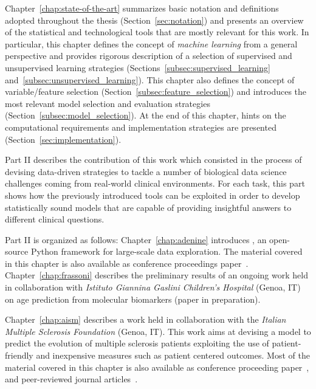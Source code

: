 Chapter~\ref{chap:state-of-the-art} summarizes basic notation and definitions adopted throughout the thesis (Section~\ref{sec:notation}) and presents an overview of the statistical and technological tools that are mostly relevant for this work. In particular, this chapter defines the concept of \textit{machine learning} from a general perspective and provides rigorous description of a selection of supervised and unsupervised learning strategies (Sections~\ref{subsec:supervised_learning} and~\ref{subsec:unsupervised_learning}).
This chapter also defines the concept of variable/feature selection (Section~\ref{subsec:feature_selection}) and introduces the most relevant model selection and evaluation strategies (Section~\ref{subsec:model_selection}).
At the end of this chapter, hints on the computational requirements and implementation strategies are presented (Section~\ref{sec:implementation}).

Part II describes the contribution of this work which consisted in the process of devising data-driven strategies to tackle a number of biological data science challenges coming from real-world clinical environments. For each task, this part shows how the previously introduced tools can be exploited in order to develop statistically sound models that are capable of providing insightful answers to different clinical questions.

Part II is organized as follows:
Chapter~\ref{chap:adenine} introduces \ade, an open-source Python framework for large-scale data exploration. %
The material covered in this chapter is also available as conference proceedings paper~\cite{fiorini2017adenine}.
Chapter~\ref{chap:frassoni} describes the preliminary results of an ongoing work held in collaboration with \textit{Istituto Giannina Gaslini Children's Hospital} (Genoa, IT) on age prediction from molecular biomarkers (paper in preparation).

Chapter~\ref{chap:aism} describes a work held in collaboration with the \textit{Italian Multiple Sclerosis Foundation} (Genoa, IT). This work aims at devising a model to predict the evolution of multiple sclerosis patients exploiting the use of patient-friendly and inexpensive measures such as patient centered outcomes.
Most of the material covered in this chapter is also available as conference proceeding paper~\cite{fiorini2015machine}, and peer-reviewed journal articles~\cite{brichetto2015improving, fiorini2016temporal, brichetto2016predicting, pmlr-v68-fiorini17a, tacchino2017multiple}.

